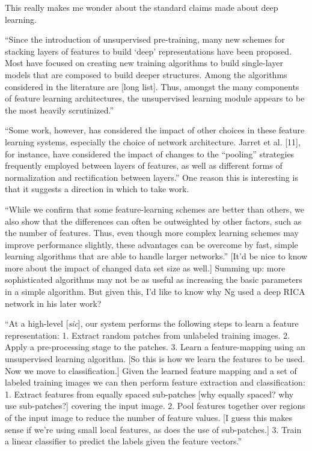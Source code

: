 \documentclass[12pt]{report}
\begin{document}
This really makes me wonder about the standard claims made about deep
learning.

``Since the introduction of unsupervised pre-training, many new
schemes for stacking layers of features to build `deep'
representations have been proposed.  Most have focused on creating new
training algorithms to build single-layer models that are composed to
build deeper structures.  Among the algorithms considered in the
literature are [long list].  Thus, amongst the many components of
feature learning architectures, the unsupervised learning module
appears to be the most heavily scrutinized.''

``Some work, however, has considered the impact of other choices in
these feature learning systems, especially the choice of network
architecture.  Jarret et al. [11], for instance, have considered the
impact of changes to the ``pooling'' strategies frequently employed
between layers of features, as well as different forms of
normalization and rectification between layers.''  One reason this is
interesting is that it suggests a direction in which to take work.

``While we confirm that some feature-learning schemes are better than
others, we also show that the differences can often be outweighted by
other factors, such as the number of features.  Thus, even though more
complex learning schemes may improve performance slightly, these
advantages can be overcome by fast, simple learning algorithms that
are able to handle larger networks.''  [It'd be nice to know more
about the impact of changed data set size as well.]  Summing up: more
sophisticated algorithms may not be as useful as increasing the basic
parameters in a simple algorithm.  But given this, I'd like to know
why Ng used a deep RICA network in his later work?

``At a high-level [\emph{sic}], our system performs the following
steps to learn a feature representation: 1. Extract random patches
from unlabeled training images.  2. Apply a pre-processing stage to
the patches. 3. Learn a feature-mapping using an unsupervised learning
algorithm. [So this is how we learn the features to be used.  Now we
move to classification.]  Given the learned feature mapping and a set
of labeled training images we can then perform feature extraction and
classification: 1. Extract features from equally spaced sub-patches
[why equally spaced? why use sub-patches?] covering the input image.
2. Pool features together over regions of the input image to reduce
the number of feature values. [I guess this makes sense if we're using
small local features, as does the use of sub-patches.]  3. Train a
linear classifier to predict the labels given the feature vectors.''
\end{document}

